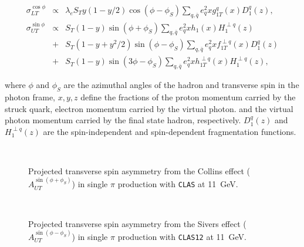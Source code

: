 \begin{eqnarray}
\sigma^{\cos\phi}_{LT} &\propto& \lambda_e S_T y (1-y/2) \cos(\phi - \phi_S)\sum_{q,\bar{q}} e^2_q {x g_{1T}^q(x)} {D_1^{q}(z)}, \\
\sigma^{\sin\phi}_{UT}&\propto&             S_T (1-y)\sin(\phi+\phi_S)\sum_{q,\bar{q}} e^2_q {x h_1(x)} {H_1^{\perp q}(z)}  \nonumber  \\
       &+&             S_T (1-y+y^2/2)\sin(\phi-\phi_S)\sum_{q,\bar{q}} e^2_q {x f^{\perp q}_{1T}(x)} {D_1^{q}(z)} \nonumber\\
       &+&             S_T (1-y)\sin(3\phi-\phi_S)\sum_{q,\bar{q}} e^2_q {x h^{\perp q}_{1T}(x)} {H_1^{\perp q}(z)},
\label{sivco} 
\end{eqnarray}

\noindent 
where $\phi$ and $\phi_S$ are the azimuthal angles of the hadron and transverse 
spin in the photon frame, $x,y,z$ define the fractions of the proton momentum
carried by the struck quark, electron momentum carried by the virtual photon.
and the virtual photon momentum carried by the final state hadron, respectively.
$D_1^{q}(z)$ and $H_1^{\perp {q}}(z)$ are the spin-independent and 
spin-dependent fragmentation functions. 

\begin{figure}[tb]
\begin{center}
\vspace{-6.0cm}
\mbox{  }
\caption{\small{Projected transverse spin asymmetry from the Collins effect 
($A_{UT}^{\sin(\phi+\phi_S)}$) in single $\pi$ production with {\tt CLAS} at 
11~GeV.}} 
\label{fig:autcol}
\end{center}
\end{figure}

\vspace{0.2cm}\noindent

\begin{figure}[tb]
\begin{center}
\vspace{-6.0cm}
\mbox{  }
\caption{\small{Projected transverse spin asymmetry from the Sivers effect 
($A_{UT}^{\sin(\phi-\phi_S)}$) in single $\pi$ production with {\tt CLAS12} 
at 11~GeV.}}
\label{fig:autsiv}
\end{center}
\end{figure}


